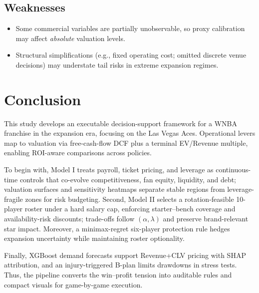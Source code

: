\documentclass[12pt]{article}
\numberwithin{figure}{section}
\numberwithin{table}{section}
\begin{document}
	\subsection{Weaknesses}
	\begin{itemize}\setlength\itemsep{0.2em}
		\item Some commercial variables are partially unobservable, so proxy calibration may affect \emph{absolute} valuation levels.
		\item Structural simplifications (e.g., fixed operating cost; omitted discrete venue decisions) may understate tail risks in extreme expansion regimes.
	\end{itemize}
		
	\section{Conclusion}

	This study develops an executable decision-support framework for a WNBA franchise in the expansion era, focusing on the Las Vegas Aces. Operational levers map to valuation via free-cash-flow DCF plus a terminal EV/Revenue multiple, enabling ROI-aware comparisons across policies.
	

	To begin with, Model I treats payroll, ticket pricing, and leverage as continuous-time controls that co-evolve competitiveness, fan equity, liquidity, and debt; valuation surfaces and sensitivity heatmaps separate stable regions from leverage-fragile zones for risk budgeting. Second, Model II selects a rotation-feasible 10-player roster under a hard salary cap, enforcing starter--bench coverage and availability-risk discounts; trade-offs follow $(\alpha,\lambda)$ and preserve brand-relevant star impact. Moreover, a minimax-regret six-player protection rule hedges expansion uncertainty while maintaining roster optionality.
	

	Finally, XGBoost demand forecasts support Revenue+CLV pricing with SHAP attribution, and an injury-triggered B-plan limits drawdowns in stress tests. Thus, the pipeline converts the win--profit tension into auditable rules and compact visuals for game-by-game execution.

	
	

	
	
	
	
\end{document}
